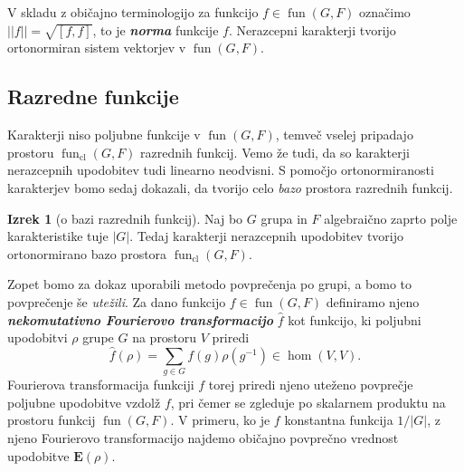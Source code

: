 \documentclass[11pt]{book}
\def\EE{\mathbf{E}}
\DeclareMathOperator\cl{cl}
\DeclareMathOperator\fun{fun}
\def\definicija{\color{rdeca}\bf\em}
\theoremstyle{definition}
\theoremstyle{zgled}
\theoremstyle{odprtproblem}
\theoremstyle{domacanaloga}
\theoremstyle{izrek}
\newtheorem*{izrek}{Izrek}
\begin{document}
V skladu z običajno terminologijo za funkcijo $f \in \fun(G,F)$ označimo $||f|| = \sqrt{[ f, f ]}$, to je {\definicija norma} funkcije $f$. Nerazcepni karakterji tvorijo ortonormiran sistem vektorjev v $\fun(G,F)$.

\subsection{Razredne funkcije}

Karakterji niso poljubne funkcije v $\fun(G,F)$, temveč vselej pripadajo prostoru $\fun_{\cl}(G,F)$ razrednih funkcij. Vemo že tudi, da so karakterji nerazcepnih upodobitev tudi linearno neodvisni. S pomočjo ortonormiranosti karakterjev bomo sedaj dokazali, da tvorijo celo \emph{bazo} prostora razrednih funkcij. 

\begin{izrek}[o bazi razrednih funkcij]
    Naj bo $G$ grupa in $F$ algebraično zaprto polje karakteristike tuje $|G|$. Tedaj karakterji nerazcepnih upodobitev tvorijo ortonormirano bazo prostora $\fun_{\cl}(G,F)$.
\end{izrek}

Zopet bomo za dokaz uporabili metodo povprečenja po grupi, a bomo to povprečenje še \emph{utežili}. Za dano funkcijo $f \in \fun(G,F)$ definiramo njeno {\definicija nekomutativno Fourierovo transformacijo} $\hat{f}$ kot funkcijo, ki poljubni upodobitvi $\rho$ grupe $G$ na prostoru $V$ priredi
\[
    \hat{f}(\rho) = \sum_{g \in G} f(g) \rho(g^{-1}) \in \hom(V,V).
\]
Fourierova transformacija funkciji $f$ torej priredi njeno uteženo povprečje poljubne upodobitve vzdolž $f$, pri čemer se zgleduje po skalarnem produktu na prostoru funkcij $\fun(G,F)$. V primeru, ko je $f$ konstantna funkcija $1/|G|$, z njeno Fourierovo transformacijo najdemo običajno povprečno vrednost upodobitve $\EE(\rho)$.
\end{document}
